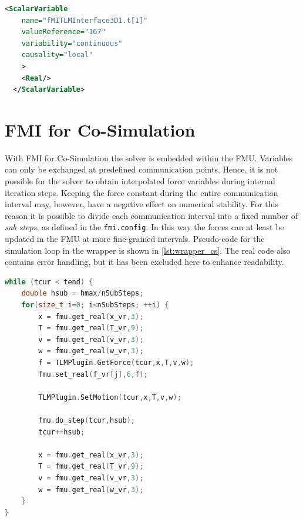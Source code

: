 \documentclass[11pt,a4paper,english]{report}
\begin{document}
\begin{lstlisting}[language=XML,float,floatplacement=ht,caption=Value references for variables are obtained from \texttt{modelDescription.xml},label=lst:modeldescription]
  <ScalarVariable
    name="fMITLMInterface3D1.t[1]"
    valueReference="167"
    variability="continuous"
    causality="local"
    >
    <Real/>
  </ScalarVariable>
\end{lstlisting}


\clearpage
\section{FMI for Co-Simulation}
\label{sec:fmi_cs}
With FMI for Co-Simulation the solver is embedded within the FMU.
Variables can only be exchanged at predefined communication points.
Hence, it is not possible for the solver to obtain interpolated force variables during internal iteration steps.
Keeping the force constant during the entire communication interval may, however, have a negative effect on numerical stability.
For this reason it is possible to divide each communication interval into a fixed number of \textit{sub steps}, as defined in the \texttt{fmi.config}.
In this way the forces can at least be updated in the FMU at more fine-grained intervals.
Pseudo-code for the simulation loop in the wrapper is shown in \cref{lst:wrapper_cs}.
The real code also contains error handling, but it has been excluded here to enhance readability.

\begin{lstlisting}[language=c++, basicstyle=\ttfamily\small,floatplacement=htb,caption=Pseudo code for the simulation loop with FMI for co-simulation,label=lst:wrapper_cs]
while (tcur < tend) {
    double hsub = hmax/nSubSteps;
    for(size_t i=0; i<nSubSteps; ++i) {
        x = fmu.get_real(x_vr,3);
        T = fmu.get_real(T_vr,9);
        v = fmu.get_real(v_vr,3);
        w = fmu.get_real(w_vr,3);
        f = TLMPlugin.GetForce(tcur,x,T,v,w);
        fmu.set_real(f_vr[j],6,f);
        
        TLMPlugin.SetMotion(tcur,x,T,v,w);

        fmu.do_step(tcur,hsub);
        tcur+=hsub;

        x = fmu.get_real(x_vr,3);
        T = fmu.get_real(T_vr,9);
        v = fmu.get_real(v_vr,3);
        w = fmu.get_real(w_vr,3);
    }
}
\end{lstlisting}
\end{document}
